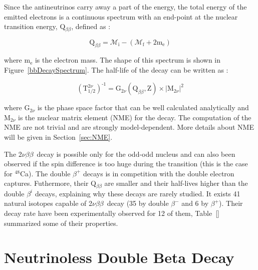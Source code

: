 \documentclass[main.tex]{subfiles}
\begin{document}
\bigskip


\NI Since the antineutrinos carry away a part of the energy, the total energy of the emitted electrons is a continuous spectrum with an end-point at the nuclear transition energy, Q$_{\beta\beta}$, defined as :


\begin{equation}
\text{Q}_{\beta\beta} = \mathcal{M}_\text{i} - (\mathcal{M}_\text{f} + \text{2m}_\text{e})
\end{equation}


\bigskip


\NI where m$_\text{e}$ is the electron mass. The shape of this spectrum is shown in Figure~\ref{bbDecaySpectrum}. The half-life of the decay can be written as : 


\begin{equation}
(\text{T}_{\text{1/2}}^{\text{2}\nu})^{\text{-1}} = \text{G}_{\text{2}\nu}(\text{Q}_{\beta\beta}, \text{Z}) \times |\text{M}_{\text{2}\nu}|^\text{2}
\end{equation}


\bigskip


\NI where G$_{\text{2}\nu}$ is the phase space factor that can be well calculated analytically and M$_{\text{2}\nu}$ is the nuclear matrix element (NME) for the decay. The computation of the NME are not trivial and are strongly model-dependent. More details about NME will be given in Section~\ref{sec:NME}.






\NI The 2$\nu\beta\beta$~decay is possible only for the odd-odd nucleus and can also been observed if the spin difference is too huge during the transition (this is the case for $^{\text{48}}$Ca). The double $\beta^{+}$ decays is in competition with the double electron captures. Futhermore, their Q$_{\beta\beta}$ are smaller and their half-lives higher than the double $\beta^{i}$ decays, explaining why these decays are rarely studied. It exists 41 natural isotopes capable of 2$\nu\beta\beta$~decay (35 by double $\beta^{-}$ and 6 by $\beta^{+}$). Their decay rate have been experimentally observed for 12 of them, Table~[] summarized some of their properties.

\section{Neutrinoless Double Beta Decay}\label{sec:0NeutrinoDBD}
\end{document}
